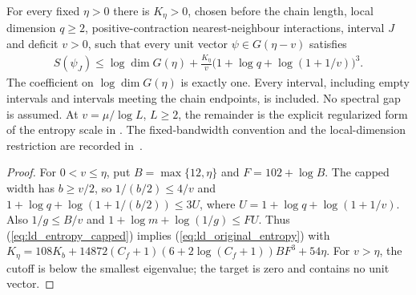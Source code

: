 \begin{theorem}
    \label{thm:physical_low_density_entropy}
    \leanok
    For every fixed $\eta>0$ there is $K_\eta>0$, chosen before the
    chain length, local dimension $q\ge2$, positive-contraction
    nearest-neighbour interactions, interval $J$ and deficit $v>0$,
    such that every unit vector $\psi\in G(\eta-v)$ satisfies
    \begin{align}
        S(\psi_J)\le\log\dim G(\eta)+
        \frac{K_\eta}{v}
        \bigl(1+\log q+\log(1+1/v)\bigr)^3.
        \label{eq:ld_original_entropy}
    \end{align}
    The coefficient on $\log\dim G(\eta)$ is exactly one.
    Every interval, including empty intervals and intervals meeting
    the chain endpoints, is included. No spectral gap is assumed.
    At $v=\mu/\log L$, $L\ge2$, the remainder is the explicit
    regularized form of the entropy scale in
    \cite[Section~4.5]{Arad2016RigorousRG}.
    The fixed-bandwidth convention and the local-dimension restriction
    are recorded in~\cite{gap:alvv16_low_energy_family_scope}.
\end{theorem}
\begin{proof}\leanok
    For $0<v\le\eta$, put $B=\max\{12,\eta\}$ and $F=102+\log B$.
    The capped width has $b\ge v/2$, so $1/(b/2)\le4/v$ and
    $1+\log q+\log(1+1/(b/2))\le3U$, where
    $U=1+\log q+\log(1+1/v)$. Also $1/g\le B/v$ and
    $1+\log m+\log(1/g)\le FU$.
    Thus (\ref{eq:ld_entropy_capped}) implies
    (\ref{eq:ld_original_entropy}) with
    $K_\eta=108K_b+14872(C_f+1)(6+2\log(C_f+1))BF^3+54\eta$.
    For $v>\eta$, the cutoff is below the smallest eigenvalue;
    the target is zero and contains no unit vector.
\end{proof}
